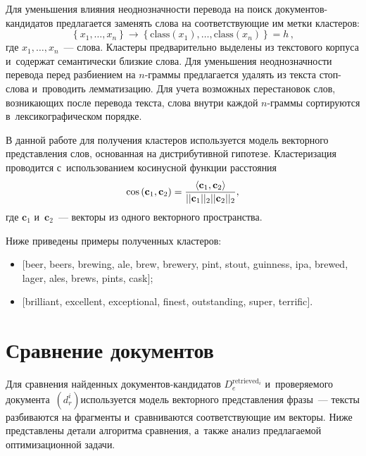 \begin{multicols}{2}
Для уменьшения влияния не\-од\-но\-знач\-ности перевода на поиск до\-ку\-мен\-тов-кан\-ди\-да\-тов 
предлагается заменять слова на соответствующие им метки кластеров:
$$
\left\{x_1, \ldots, x_n\right\} \rightarrow \left\{ \mbox{class}\left(x_1\right), \ldots, 
\mbox{class}\left(x_n\right)\right\} = h\,,
$$
где $x_1, \ldots, x_n$~--- слова. Кластеры предварительно выделены из текстового 
корпуса и~содержат семантически близкие слова.
Для уменьшения неоднозначности перевода перед разбиением на $n$-граммы 
предлагается удалять из текста стоп-сло\-ва и~проводить лемматизацию. Для учета 
возможных перестановок слов, возникающих после перевода текста, слова внутри 
каждой $n$-грам\-мы сортируются в~лексикографическом порядке.

В данной работе для получения кластеров используется модель векторного 
представления слов, основанная на дистрибутивной гипотезе. Кластеризация 
проводится с~использованием косинусной функции расстояния
\begin{equation}
\label{eq:cos}
    \cos \left(\mathbf{c}_1, \mathbf{c}_2\right) = \displaystyle\frac{\displaystyle \langle\mathbf{c}_1, 
\mathbf{c}_2\rangle\mathstrut}{\displaystyle {||\mathbf{c}_1||_2||\mathbf{c}_2||_2}\mathstrut},
\end{equation}
где $\mathbf{c}_1$ и~$\mathbf{c}_2$~--- векторы из одного векторного пространства.


Ниже приведены примеры полученных кластеров:
\begin{itemize}
\item $[$beer, beers, brewing, ale, brew, brewery, pint, stout, guinness, 
ipa, brewed, lager, ales, brews, pints, cask$]$;
\item $[$brilliant, excellent, exceptional, finest, outstanding, super, 
terrific$]$.
\end{itemize}


\vspace*{-6pt}

\section{Сравнение документов}

Для сравнения найденных документов-кан\-ди\-да\-тов $D_e^{\mathrm{retrieved}_i}$ 
и~проверяемого документа~$(d_r^i)$\linebreak используется модель векторного пред\-став\-ле\-ния 
фразы~--- текс\-ты разбиваются на фрагменты и~сравниваются соответствующие им 
векторы. Ниже пред\-став\-ле\-ны детали алгоритма сравнения, а~также анализ 
пред\-ла\-га\-емой оптимизационной задачи.


\end{multicols}
